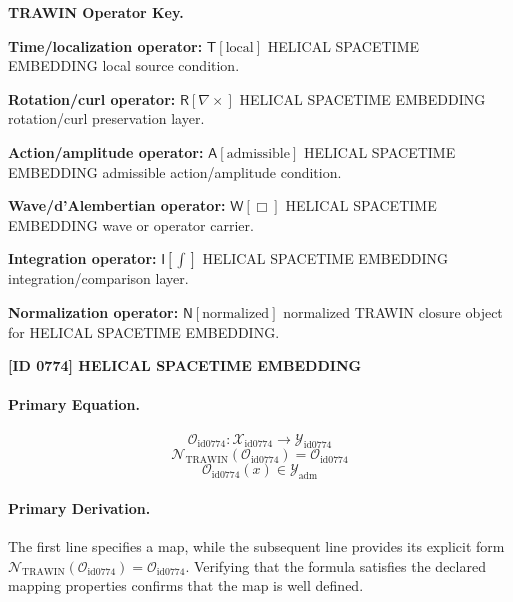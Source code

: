 \par\vspace{0.45\baselineskip}
\noindent\begin{minipage}[t]{\linewidth}
\begingroup
\small
\raggedright
\textbf{TRAWIN Operator Key.}\par
\noindent\textbf{Time/localization operator:} $\mathsf{T}\!\left[\mathrm{local}\right]$ HELICAL SPACETIME EMBEDDING local source condition.\par
\noindent\textbf{Rotation/curl operator:} $\mathsf{R}\!\left[\nabla\times\right]$ HELICAL SPACETIME EMBEDDING rotation/curl preservation layer.\par
\noindent\textbf{Action/amplitude operator:} $\mathsf{A}\!\left[\mathrm{admissible}\right]$ HELICAL SPACETIME EMBEDDING admissible action/amplitude condition.\par
\noindent\textbf{Wave/d'Alembertian operator:} $\mathsf{W}\!\left[\Box\right]$ HELICAL SPACETIME EMBEDDING wave or operator carrier.\par
\noindent\textbf{Integration operator:} $\mathsf{I}\!\left[\int\right]$ HELICAL SPACETIME EMBEDDING integration/comparison layer.\par
\noindent\textbf{Normalization operator:} $\mathsf{N}\!\left[\mathrm{normalized}\right]$ normalized TRAWIN closure object for HELICAL SPACETIME EMBEDDING.\par
\endgroup
\end{minipage}

\clearpage
\noindent\textbf{[ID 0774] HELICAL SPACETIME EMBEDDING}\par
\vspace{0.35em}
\paragraph{Primary Equation.}
\[
\mathcal{O}_{\mathrm{id0774}}:\mathcal{X}_{\mathrm{id0774}}\longrightarrow\mathcal{Y}_{\mathrm{id0774}}
\]
\[
\mathcal{N}_{\mathrm{TRAWIN}}(\mathcal{O}_{\mathrm{id0774}})=\mathcal{O}_{\mathrm{id0774}}
\]
\[
\mathcal{O}_{\mathrm{id0774}}(x)\in\mathcal{Y}_{\mathrm{adm}}
\]

\paragraph{Primary Derivation.}
The first line specifies a map, while the subsequent line provides its explicit form \( \mathcal{N}_{\mathrm{TRAWIN}}(\mathcal{O}_{\mathrm{id0774}})=\mathcal{O}_{\mathrm{id0774}} \). Verifying that the formula satisfies the declared mapping properties confirms that the map is well defined.
